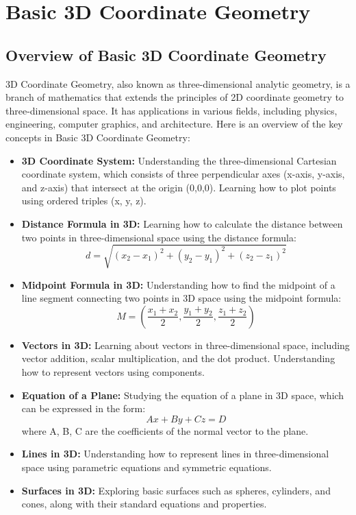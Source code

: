 \documentclass[openany]{book}
\begin{document}
\section{Basic 3D Coordinate Geometry}
\subsection{Overview of Basic 3D Coordinate Geometry}
3D Coordinate Geometry, also known as three-dimensional analytic geometry, is a branch of mathematics that extends the principles of 2D coordinate geometry to three-dimensional space. It has applications in various fields, including physics, engineering, computer graphics, and architecture. Here is an overview of the key concepts in Basic 3D Coordinate Geometry:
\begin{itemize}
    \item \textbf{3D Coordinate System:} Understanding the three-dimensional Cartesian coordinate system, which consists of three perpendicular axes (x-axis, y-axis, and z-axis) that intersect at the origin (0,0,0). Learning how to plot points using ordered triples (x, y, z).
    \item \textbf{Distance Formula in 3D:} Learning how to calculate the distance between two points in three-dimensional space using the distance formula:
    \[
    d = \sqrt{(x_2 - x_1)^2 + (y_2 - y_1)^2 + (z_2 - z_1)^2}
    \]
    \item \textbf{Midpoint Formula in 3D:} Understanding how to find the midpoint of a line segment connecting two points in 3D space using the midpoint formula:
    \[
    M = \left( \frac{x_1 + x_2}{2}, \frac{y_1 + y_2}{2}, \frac{z_1 + z_2}{2} \right)
    \]
    \item \textbf{Vectors in 3D:} Learning about vectors in three-dimensional space, including vector addition, scalar multiplication, and the dot product. Understanding how to represent vectors using components.
    \item \textbf{Equation of a Plane:} Studying the equation of a plane in 3D space, which can be expressed in the form:
    \[
    Ax + By + Cz = D
    \]
    where A, B, C are the coefficients of the normal vector to the plane.
    \item \textbf{Lines in 3D:} Understanding how to represent lines in three-dimensional space using parametric equations and symmetric equations.
    \item \textbf{Surfaces in 3D:} Exploring basic surfaces such as spheres, cylinders, and cones, along with their standard equations and properties.

\end{itemize}
\end{document}
